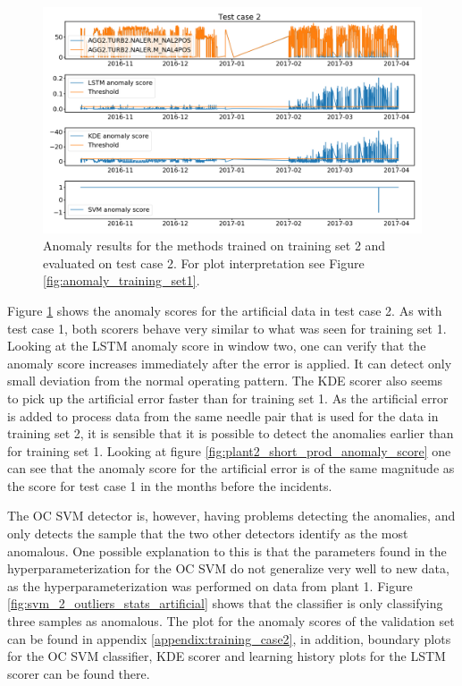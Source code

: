         \begin{figure}[h!]
            \centering
            \includegraphics[width=\textwidth]{report/figures/analysis/plant2_train_short/artificial_data_anomaly.png}
            \caption{Anomaly results for the methods trained on training set 2 and evaluated on test case 2. For plot interpretation see Figure \ref{fig:anomaly_training_set1}.}
            \label{fig:plan2_short_arti_anomaly_score}
        \end{figure}
        Figure \ref{fig:plan2_short_arti_anomaly_score} shows the anomaly scores for the artificial data in test case 2. As with test case 1, both scorers behave very similar to what was seen for training set 1. Looking at the LSTM anomaly score in window two, one can verify that the anomaly score increases immediately after the error is applied. It can detect only small deviation from the normal operating pattern. The  KDE scorer also seems to pick up the artificial error faster than for training set 1. As the artificial error is added to process data from the same needle pair that is used for the data in training set 2, it is sensible that it is possible to detect the anomalies earlier than for training set 1. Looking at figure \ref{fig:plant2_short_prod_anomaly_score} one can see that the anomaly score for the artificial error is of the same magnitude as the score for test case 1 in the months before the incidents. 
        
        The OC SVM detector is, however, having problems detecting the anomalies, and only detects the sample that the two other detectors identify as the most anomalous. One possible explanation to this is that the parameters found in the hyperparameterization for the OC SVM do not generalize very well to new data, as the hyperparameterization was performed on data from plant 1. Figure \ref{fig:svm_2_outliers_stats_artificial} shows that the classifier is only classifying three samples as anomalous. The plot for the anomaly scores of the validation set can be found in appendix \ref{appendix:training_case2}, in addition, boundary plots for the OC SVM classifier, KDE scorer and learning history plots for the LSTM scorer can be found there.
        

